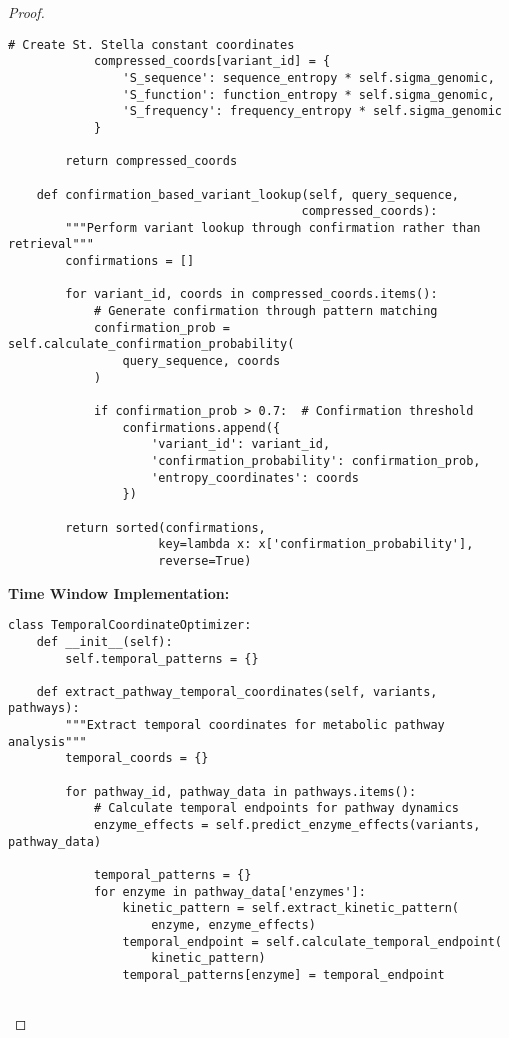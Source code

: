 \documentclass[12pt,a4paper]{article}
\begin{document}
\begin{proof}
\begin{lstlisting}[style=pythonstyle, caption=Knowledge Window Confirmation Processing]
            # Create St. Stella constant coordinates
            compressed_coords[variant_id] = {
                'S_sequence': sequence_entropy * self.sigma_genomic,
                'S_function': function_entropy * self.sigma_genomic,
                'S_frequency': frequency_entropy * self.sigma_genomic
            }
        
        return compressed_coords
    
    def confirmation_based_variant_lookup(self, query_sequence, 
                                         compressed_coords):
        """Perform variant lookup through confirmation rather than retrieval"""
        confirmations = []
        
        for variant_id, coords in compressed_coords.items():
            # Generate confirmation through pattern matching
            confirmation_prob = self.calculate_confirmation_probability(
                query_sequence, coords
            )
            
            if confirmation_prob > 0.7:  # Confirmation threshold
                confirmations.append({
                    'variant_id': variant_id,
                    'confirmation_probability': confirmation_prob,
                    'entropy_coordinates': coords
                })
        
        return sorted(confirmations, 
                     key=lambda x: x['confirmation_probability'], 
                     reverse=True)
\end{lstlisting}

\textbf{Time Window Implementation:}
\begin{lstlisting}[style=pythonstyle, caption=Temporal Coordinate Optimization]
class TemporalCoordinateOptimizer:
    def __init__(self):
        self.temporal_patterns = {}
        
    def extract_pathway_temporal_coordinates(self, variants, pathways):
        """Extract temporal coordinates for metabolic pathway analysis"""
        temporal_coords = {}
        
        for pathway_id, pathway_data in pathways.items():
            # Calculate temporal endpoints for pathway dynamics
            enzyme_effects = self.predict_enzyme_effects(variants, pathway_data)
            
            temporal_patterns = {}
            for enzyme in pathway_data['enzymes']:
                kinetic_pattern = self.extract_kinetic_pattern(
                    enzyme, enzyme_effects)
                temporal_endpoint = self.calculate_temporal_endpoint(
                    kinetic_pattern)
                temporal_patterns[enzyme] = temporal_endpoint
            

\end{lstlisting}
\end{proof}
\end{document}
